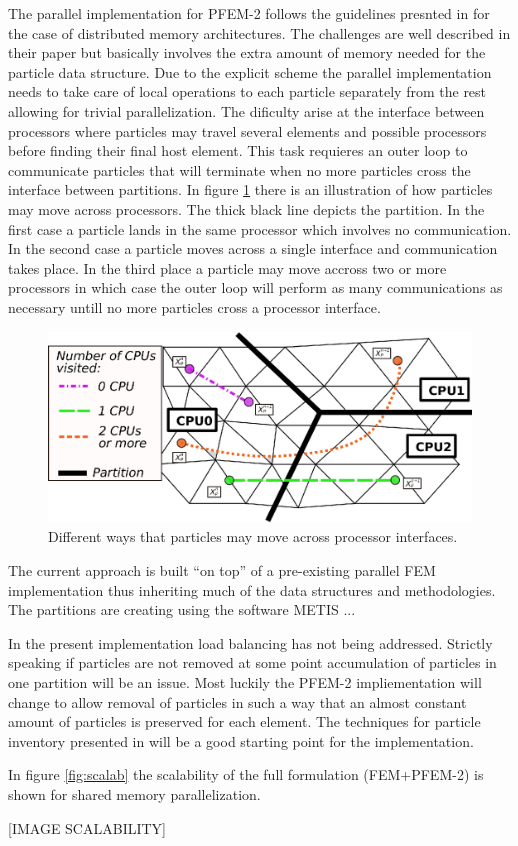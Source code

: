 The parallel implementation for PFEM-2 follows the guidelines presnted in \cite{gimenez:parallel} for the case of distributed memory architectures. The challenges are well described in their paper but basically involves the extra amount of memory needed for the particle data structure. Due to the explicit scheme the parallel implementation needs to take care of local operations to each particle separately from the rest allowing for trivial parallelization. The dificulty arise at the interface between processors where particles may travel several elements and possible processors before finding their final host element. This task requieres an outer loop to communicate particles that will terminate when no more particles cross the interface between partitions. In figure \ref{fig:parallel} there is an illustration of how particles may move across processors. The thick black line depicts the partition. In the first case a particle lands in the same processor which involves no communication. In the second case a particle moves across a single interface and communication takes place. In the third place a particle may move accross two or more processors in which case the outer loop will perform as many communications as necessary untill no more particles cross a processor interface.

\begin{figure}[htp] 
\centering 
\includegraphics[scale=.6]{./imgs/parallel.eps}
\caption{Different ways that particles may move across processor interfaces.}
\label{fig:parallel}
\end{figure}


The current approach is built ``on top'' of a pre-existing parallel FEM implementation thus inheriting much of the data structures and methodologies. The partitions are creating using the software METIS \cite{metis1,metis}...

In the present implementation load balancing has not being addressed. Strictly speaking if particles are not removed at some point accumulation of particles in one partition will be an issue. Most luckily the PFEM-2 impliementation will change to allow removal of particles in such a way that an almost constant amount of particles is preserved for each element. The techniques for particle inventory presented in \cite{gimenez-difusion} will be a good starting point for the implementation.

In figure \ref{fig:scalab} the scalability of the full formulation (FEM+PFEM-2) is shown for shared memory parallelization. 

[IMAGE SCALABILITY]


 
